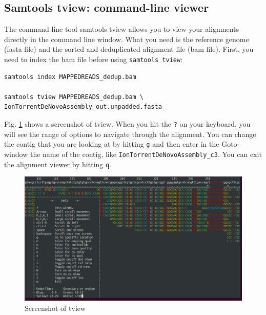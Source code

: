 \documentclass[11pt]{article}
\begin{document}
\subsection{Samtools tview: command-line viewer}
\label{sec:orgheadline7}
The command line tool samtools tview allows you to view your
alignments directly in the command line window. What you need is the
reference genome (fasta file) and the sorted and deduplicated
alignment file (bam file). First, you need to index the bam file
before using \texttt{samtools tview}:


\begin{verbatim}
samtools index MAPPEDREADS_dedup.bam

samtools tview MAPPEDREADS_dedup.bam \
IonTorrentDeNovoAssembly_out.unpadded.fasta
\end{verbatim}


Fig. \ref{fig:orgparagraph1} shows a screenshot of tview.  When you hit the \texttt{?} on
your keyboard, you will see the range of options to navigate through
the alignment. You can change the contig that you are looking at by
hitting \texttt{g} and then enter in the Goto-window the name of the contig,
like \texttt{IonTorrentDeNovoAssembly\_c3}.  You can exit the alignment viewer
by hitting \texttt{q}.

\begin{figure}[htb]
\centering
\includegraphics[width=14.5cm]{tview.png}
\caption{\label{fig:orgparagraph1}
Screenshot of tview}
\end{figure}

\clearpage
\end{document}
